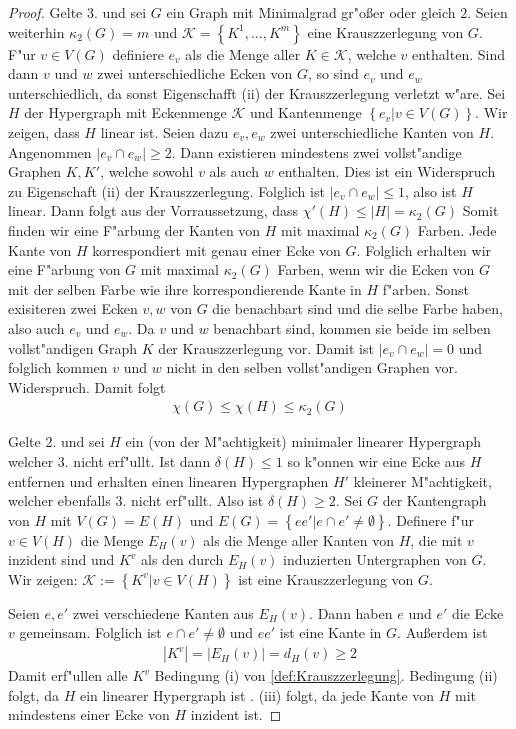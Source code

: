\begin{proof}
  Gelte 3. und sei $G$ ein Graph mit Minimalgrad gr"o{\ss}er oder gleich $2$. Seien weiterhin $\kappa_{2}(G) = m $ und $\mathcal{K}= \left\{ K^{1},\dots,K^{m} \right\}$ eine Krauszzerlegung von $G$. 
  F"ur $v\in V(G)$ definiere $e_v$ als die Menge aller $K\in \mathcal{K}$, welche $v$ enthalten. Sind dann $v$ und $w$ zwei unterschiedliche Ecken von $G$, so sind $e_v$ und $e_{w}$ unterschiedlich, da sonst Eigenschafft (ii) der Krauszzerlegung verletzt w"are. 
  Sei $H$ der Hypergraph mit Eckenmenge $\mathcal{K}$ und Kantenmenge $\left\{ e_v| v\in V(G) \right\}$. 
  Wir zeigen, dass $H$ linear ist. 
  Seien dazu $e_{v},e_{w} $ zwei unterschiedliche Kanten von $H$.
  Angenommen $|e_{v}\cap e_{w}| \geq 2$. Dann existieren mindestens zwei vollst"andige Graphen $K,K'$, welche sowohl $v$ als auch $w$ enthalten. Dies ist ein Widerspruch zu Eigenschaft (ii) der Krauszzerlegung. Folglich ist $|e_{v}\cap e_{w}| \leq 1$, also ist $H$ linear. Dann folgt aus der Vorraussetzung, dass $\chi'(H) \leq |H| = \kappa_{2}(G)$ 
  Somit finden wir eine F"arbung der Kanten von $H$ mit maximal $\kappa_{2}(G)$ Farben. Jede Kante von $H$ korrespondiert mit genau einer Ecke von $G$. Folglich erhalten wir eine F"arbung von $G$ mit maximal $\kappa_{2}(G)$ Farben, wenn wir die Ecken von $G$ mit der selben Farbe wie ihre korrespondierende Kante in $H$ f"arben.  Sonst exisiteren zwei Ecken $v,w$ von $G$ die benachbart sind und die selbe Farbe haben, 
also auch $e_v$ und $e_w$. Da $v$ und $w$ benachbart sind, kommen sie beide im selben vollst"andigen Graph $K$ der Krauszzerlegung vor. Damit ist $|e_v\cap e_w| = 0$ und folglich kommen $v$ und $w$ nicht in den selben vollst"andigen Graphen vor. Widerspruch. Damit folgt
\begin{align*}
  \chi(G) \leq \chi(H) \leq \kappa_{2}(G)
\end{align*}

Gelte 2. und sei $H$ ein (von der M"achtigkeit) minimaler linearer Hypergraph welcher 3. nicht erf"ullt. Ist dann $\delta(H) \leq 1$ so k"onnen wir eine Ecke aus $H$ entfernen und erhalten einen linearen Hypergraphen $H'$ kleinerer M"achtigkeit, welcher ebenfalls 3. nicht erf"ullt. Also ist $\delta(H) \geq 2$. Sei $G$ der Kantengraph von $H$ mit $V(G) = E(H)$ und $E(G) = \left\{ ee'|e\cap e' \neq \emptyset \right\}$. Definere f"ur $v\in V(H)$ die Menge $E_{H}(v)$ als die Menge aller
Kanten von $H$, die mit $v$ inzident sind und $K^{v}$ als den durch $E_H(v)$ induzierten Untergraphen von $G$.
Wir zeigen: $\mathcal K := \left\{ K^{v}| v \in V(H) \right\}$ ist eine Krauszzerlegung von $G$.  

Seien $e,e'$ zwei verschiedene Kanten aus $E_{H}(v)$. Dann haben $e$ und $e'$ die Ecke $v$ gemeinsam. Folglich ist $e\cap e' \neq \emptyset$ und $ee'$ ist eine Kante in $G$. Au{\ss}erdem ist 
\begin{align*}
  |K^{v}| = |E_H(v)| = d_{H}(v) \geq 2
\end{align*}
Damit erf"ullen alle $K^{v}$ Bedingung (i) von \ref{def:Krauszzerlegung}. Bedingung (ii) folgt, da $H$ ein linearer Hypergraph ist . (iii) folgt, da jede Kante von $H$ mit mindestens einer Ecke von $H$ inzident ist.
\end{proof}
